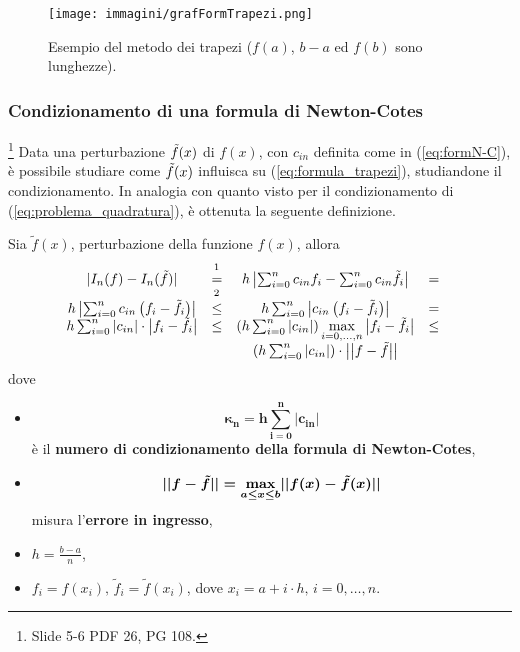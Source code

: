 \begin{figure}
    \centering
    \texttt{[image: immagini/grafFormTrapezi.png]}
    \caption{Esempio del metodo dei trapezi ($f(a)$, $b-a$ ed $f(b)$ sono lunghezze).}\label{fig:grafFormTrapezi}
\end{figure}

\subsubsection{Condizionamento di una formula di Newton-Cotes}
\footnote{Slide 5-6 PDF 26, PG 108.}
Data una perturbazione $\Tilde{f}(x)$ di $f(x)$, con $c_{in}$ definita come in (\ref{eq:formN-C}), è possibile studiare come $\Tilde{f}(x)$ influisca su (\ref{eq:formula_trapezi}), studiandone il condizionamento. In analogia con quanto visto per il condizionamento di (\ref{eq:problema_quadratura}), è ottenuta la seguente definizione.

\begin{definition}
	Sia $\tilde{f}(x)$, perturbazione della funzione $f(x)$, allora
	\begin{equation*}
	    \begin{matrix}
		        |I_n(f)-I_n(\Tilde{f})|&\overset{\footnotemark}{=}&h\left|\sum_{i=0}^n c_{in}f_i-\sum_{i=0}^n c_{in}\Tilde{f_i}\right|&=&\\
		        h\left|\sum_{i=0}^n c_{in}\left(f_i-\Tilde{f_i}\right)\right|&\overset{\footnotemark}{\leq}&h\sum_{i=0}^n \left|c_{in}\left(f_i-\Tilde{f_i}\right)\right|&=&\\
		        h\sum_{i=0}^n |c_{in}|\cdot\left|f_i-\Tilde{f_i}\right|&\leq&\left(h\sum_{i=0}^n|c_{in}|\right)\underset{i=0,\hdots,n}{\max}\left|f_i-\Tilde{f_i}\right|&\leq&\\
		        &&\left(h\sum_{i=0}^n|c_{in}|\right)\cdot \left|\left|f-\Tilde{f}\right|\right|
	    \end{matrix}
	\end{equation*}
	dove
	\begin{itemize}
		\item \begin{equation}\label{eq:numero_condizionamento_N-C}
			\boldsymbol{\kappa_n = h\sum_{i=0}^n|c_{in}|}
		\end{equation}
		è il \textbf{numero di condizionamento della formula di Newton-Cotes},
		\item \begin{equation*}
			\boldsymbol{||f-\Tilde{f}|| = \underset{a\leq x\leq b}{\max}||f(x)-\Tilde{f}(x)||}
		\end{equation*}
		misura l'\textbf{errore in ingresso},
		\item $h=\frac{b-a}{n}$,
		\item $f_i = f(x_i),\, \tilde{f}_i = \tilde{f}(x_i)$, dove $x_i = a + i\cdot h,\, i = 0,\hdots, n$.
	\end{itemize}
\end{definition}
\addtocounter{footnote}{-1}

